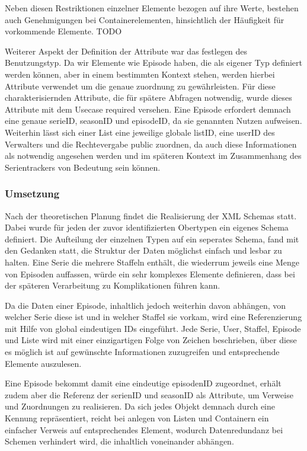 \documentclass[a4paper]{article}
\begin{document}
Neben diesen Restriktionen einzelner Elemente bezogen auf ihre Werte, bestehen auch Genehmigungen bei Containerelementen, hinsichtlich der Häufigkeit für vorkommende Elemente. TODO

Weiterer Aspekt der Definition der Attribute war das festlegen des Benutzungstyp. Da wir Elemente wie Episode haben, die als eigener Typ definiert werden können, aber in einem bestimmten Kontext stehen, werden hierbei Attribute verwendet um die genaue zuordnung zu gewährleisten. Für diese charakterisiernden Attribute, die für spätere Abfragen notwendig, wurde dieses Attribute mit dem Usecase required versehen. Eine Episode erfordert demnach eine genaue serieID, seasonID und episodeID, da sie genannten Nutzen aufweisen. Weiterhin lässt sich einer List eine jeweilige globale listID, eine userID des Verwalters und die Rechtevergabe public zuordnen, da auch diese Informationen als notwendig angesehen werden und im späteren Kontext im Zusammenhang des Serientrackers von Bedeutung sein können. 

\newpage
\subsubsection{Umsetzung}

Nach der theoretischen Planung findet die Realisierung der XML Schemas statt.
Dabei wurde für jeden der zuvor identifizierten Obertypen ein eigenes Schema definiert. Die Aufteilung der einzelnen Typen auf ein seperates Schema, fand mit den Gedanken statt, die Struktur der Daten möglichst einfach und lesbar zu halten. Eine Serie die mehrere Staffeln enthält, die wiederrum jeweils eine Menge von Episoden auffassen, würde ein sehr komplexes Elemente definieren, dass bei der späteren Verarbeitung zu Komplikationen führen kann.

Da die Daten einer Episode, inhaltlich jedoch weiterhin davon abhängen, von welcher Serie diese ist und in welcher Staffel sie vorkam, wird eine Referenzierung mit Hilfe von global eindeutigen IDs eingeführt. Jede Serie, User, Staffel, Episode und Liste wird mit einer einzigartigen Folge von Zeichen beschrieben, über diese es möglich ist auf gewünschte Informationen zuzugreifen und entsprechende Elemente auszulesen.

Eine Episode bekommt damit eine eindeutige episodenID zugeordnet, erhält zudem aber die Referenz der serienID und seasonID als Attribute, um Verweise und Zuordnungen zu realisieren. Da sich jedes Objekt demnach durch eine Kennung repräsentiert, reicht bei anlegen von Listen und Containern ein einfacher Verweis auf entsprechendes Element, wodurch Datenredundanz bei Schemen verhindert wird, die inhaltlich voneinander abhängen.
\end{document}

